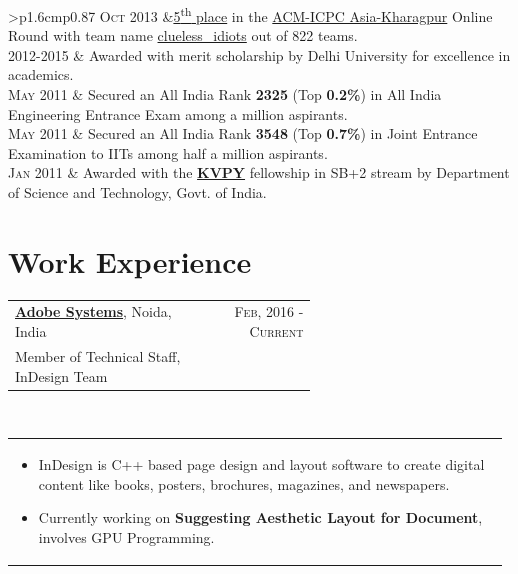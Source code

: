 \documentclass[a4paper]{article} %
\newcommand{\verticalspacing}{-0.25cm}
\newcommand{\bulletspace}{0.7cm}
\newcommand{\projectheadspacing}{6.9cm}
\newcommand{\cproject}[5]{%
    \begin{tabular}{p{0.60\linewidth}r}
        \textcolor{smokyblack}{\small #2} & \multicolumn{1}{m{ \projectheadspacing{} }}{\raggedleft \small {\textsc{#1}}}\\
        \textcolor{payne\'sgrey}{\small #3} & \small {#4}
    \end{tabular}\\
    \begin{tabular}{p{0.98\linewidth}}
    \vspace{-0.3cm}
        \small{#5}
    \end{tabular}
    \vspace{\verticalspacing{}}
}
\newcommand{\itemlist}[1]{%
    \def\arraystretch{1.2}
    \begin{tabular}{>{\raggedleft}p{1.6cm}p{0.87\linewidth}}
        #1
    \end{tabular}
    \def\arraystretch{1.0}
}
\begin{document}
\itemlist {%
    \textsc{\small Oct 2013} 		&\href{https://www.codechef.com/rankings/ACMKGP13} {5\textsuperscript{th} place} in the \href{https://www.codechef.com/ACMKGP13} {ACM-ICPC Asia-Kharagpur} Online Round with team name \href{https://www.codechef.com/teams/view/acmkg13tm154} {clueless\_idiots}  out of 822 teams.\\
    \textsc{\small 2012-2015}  	& Awarded with merit scholarship by Delhi University for excellence in academics.\\
	\textsc{\small May 2011}		& Secured an All India Rank \textbf{2325} (Top \textbf{0.2\%}) in All India Engineering Entrance Exam among a million aspirants.\\
    \textsc{\small May 2011}		& Secured an All India Rank \textbf{3548} (Top \textbf{0.7\%}) in Joint Entrance Examination to IITs among half a million aspirants.\\
	\textsc{\small Jan 2011}		& Awarded with the \href{http://www.kvpy.iisc.ernet.in/main/index.htm}{\textbf{KVPY}} fellowship in SB+2 stream by Department of Science and Technology, Govt. of India.\\
}


%
\section{Work Experience}
\cproject
      {Feb, 2016 - Current}
      {\href{http://www.adobe.com/}{\textbf{Adobe Systems}}, Noida, India}
      {Member of Technical Staff, InDesign Team}
      {}%
      {%
          \begin{itemize}[leftmargin=\bulletspace{}]
              \item InDesign is C++ based page design and layout software to create digital content like books, posters,  brochures, magazines, and newspapers.
              \item Currently working on \textbf{Suggesting Aesthetic Layout for Document}, involves GPU Programming.
          \end{itemize}
     }
     
\end{document}
